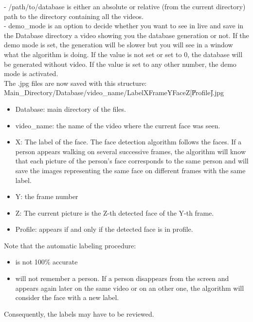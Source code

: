 - /path/to/database is either an absolute or relative (from the current directory) path to the directory containing all the videos.\\

- demo\_mode is an option to decide whether you want to see in live and save in the Database directory a video showing you the database generation or not. If the demo mode is set, the generation will be slower but you will see in a window what the algorithm is doing. If the value is not set or set to 0, the database will be generated without video. If the value is set to any other number, the demo mode is activated.\\


The .jpg files are now saved with this structure:\\

Main\_Directory/Database/video_name/LabelXFrameYFaceZ[\|Profile\|].jpg\\

\begin{itemize}
\item Database: main directory of the files.
\item video\_name: the name of the video where the current face was seen.
\item X: The label of the face. The face detection algorithm follows the faces. If a person appears walking on several successive frames, the algorithm will know that each picture of the person’s face corresponds to the same person and will save the images representing the same face on different frames with the same label.
\item Y: the frame number
\item Z: The current picture is the Z-th detected face of the Y-th frame.
\item Profile: appears if and only if the detected face is in profile.
\end{itemize}

Note that the automatic labeling procedure:
\begin{itemize}
\item is not 100\% accurate
\item will not remember a person. If a person disappears from the screen and appears again later on the same video or on an other one, the algorithm will consider the face with a new label.
\end{itemize}

Consequently, the labels may have to be reviewed.\\

